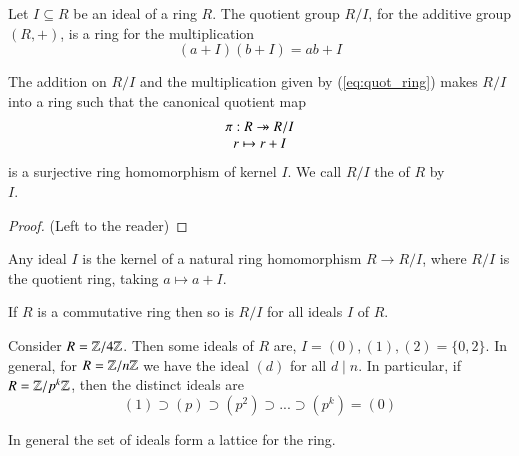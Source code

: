 \documentclass[12pt, a4paper, oneside, openright, titlepage]{book}
\begin{document}
\begin{defn}
    Let $I \subseteq R$ be an ideal of a ring $R$. The quotient group $R/I$, for the additive group $(R,+)$, is a ring for the multiplication \begin{equation}
        (a+I)(b+I) = ab+I \tag{$\star$}\label{eq:quot_ring}
    \end{equation}
\end{defn}

\begin{thm}
    The addition on $R/I$ and the multiplication given by (\ref{eq:quot_ring}) makes $R/I$ into a ring such that the canonical quotient map \begin{equation}
        \begin{array}{c} \pi: R \twoheadrightarrow R/I \\ r\mapsto r+I \end{array}
    \end{equation}
    is a surjective ring homomorphism of kernel $I$. We call $R/I$ the  of $R$ by \\$I$.
    \begin{proof}
        (Left to the reader)
    \end{proof}
\end{thm}

\begin{thm}
        Any ideal $I$ is the kernel of a natural ring homomorphism $R \rightarrow R/I$, where $R/I$ is the quotient ring, taking $a \mapsto a+I$. 
\end{thm}

\begin{rmk}
    If $R$ is a commutative ring then so is $R/I$ for all ideals $I$ of $R$.
\end{rmk}

\begin{eg}
        Consider $R = \mathbb Z/4\mathbb Z$. Then some ideals of $R$ are, $I = (0),(1),(2) = \{0,2\}$. In general, for $R = \mathbb Z/n\mathbb Z$ we have the ideal $(d)$ for all $d \;\vert\;n$. In particular, if $R = \mathbb Z/p^k\mathbb Z$, then the distinct ideals are $$(1)\supset(p)\supset(p^2)\supset...\supset(p^k)=(0)$$
\end{eg}


\begin{rmk}
        In general the set of ideals form a lattice for the ring.
\end{rmk}
\end{document}
